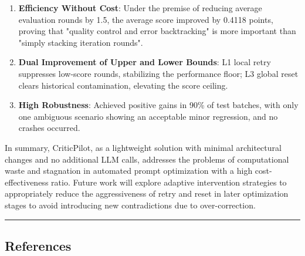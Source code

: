 \documentclass[
]{article}
\begin{document}
\begin{enumerate}
\def\labelenumi{\arabic{enumi}.}
\item
  \textbf{Efficiency Without Cost}: Under the premise of reducing
  average evaluation rounds by 1.5, the average score improved by 0.4118
  points, proving that "quality control and error backtracking" is more
  important than "simply stacking iteration rounds".
\item
  \textbf{Dual Improvement of Upper and Lower Bounds}: L1 local retry
  suppresses low-score rounds, stabilizing the performance floor; L3
  global reset clears historical contamination, elevating the score
  ceiling.
\item
  \textbf{High Robustness}: Achieved positive gains in 90\% of test
  batches, with only one ambiguous scenario showing an acceptable minor
  regression, and no crashes occurred.
\end{enumerate}

In summary, CriticPilot, as a lightweight solution with minimal
architectural changes and no additional LLM calls, addresses the
problems of computational waste and stagnation in automated prompt
optimization with a high cost-effectiveness ratio. Future work will
explore adaptive intervention strategies to appropriately reduce the
aggressiveness of retry and reset in later optimization stages to avoid
introducing new contradictions due to over-correction.

\begin{center}\rule{0.5\linewidth}{0.5pt}\end{center}

\subsection{References}\label{references}
\end{document}

